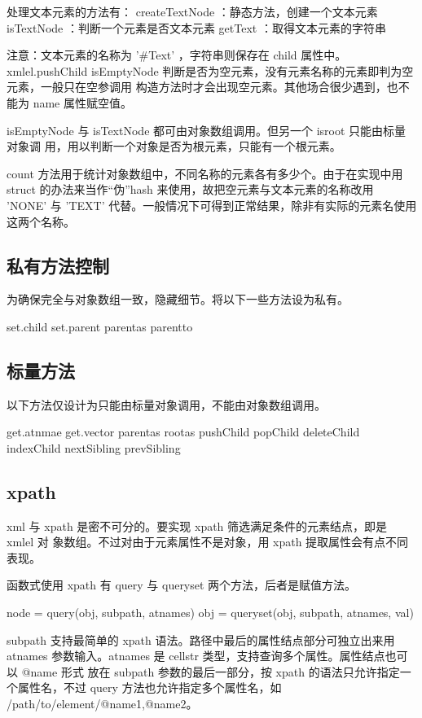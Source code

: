 处理文本元素的方法有：
createTextNode ：静态方法，创建一个文本元素
isTextNode ：判断一个元素是否文本元素
getText ：取得文本元素的字符串

注意：文本元素的名称为 '#Text' ，字符串则保存在 child 属性中。
xmlel.pushChild
isEmptyNode 判断是否为空元素，没有元素名称的元素即判为空元素，一般只在空参调用
构造方法时才会出现空元素。其他场合很少遇到，也不能为 name 属性赋空值。

isEmptyNode 与 isTextNode 都可由对象数组调用。但另一个 isroot 只能由标量对象调
用，用以判断一个对象是否为根元素，只能有一个根元素。

count 方法用于统计对象数组中，不同名称的元素各有多少个。由于在实现中用 struct
的办法来当作“伪”hash 来使用，故把空元素与文本元素的名称改用 'NONE' 与 'TEXT'
代替。一般情况下可得到正常结果，除非有实际的元素名使用这两个名称。

\subsection{私有方法控制}

为确保完全与对象数组一致，隐藏细节。将以下一些方法设为私有。

set.child
set.parent
parentas
parentto

\subsection{标量方法}

以下方法仅设计为只能由标量对象调用，不能由对象数组调用。

get.atnmae
get.vector
parentas
rootas
pushChild
popChild
deleteChild
indexChild
nextSibling
prevSibling

\subsection{xpath}

xml 与 xpath 是密不可分的。要实现 xpath 筛选满足条件的元素结点，即是 xmlel 对
象数组。不过对由于元素属性不是对象，用 xpath 提取属性会有点不同表现。

函数式使用 xpath 有 query 与 queryset 两个方法，后者是赋值方法。

node = query(obj, subpath, atnames)
obj = queryset(obj, subpath, atnames, val)

subpath 支持最简单的 xpath 语法。路径中最后的属性结点部分可独立出来用 atnames
参数输入。atnames 是 cellstr 类型，支持查询多个属性。属性结点也可以 @name 形式
放在 subpath 参数的最后一部分，按 xpath 的语法只允许指定一个属性名，不过 query
方法也允许指定多个属性名，如 /path/to/element/@name1,@name2。

